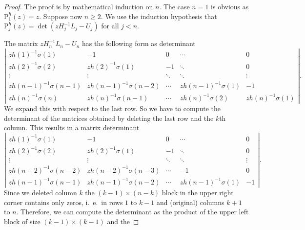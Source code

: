 \documentclass[11pt,reqno]{amsart}
\theoremstyle{plain}
\theoremstyle{remark}
\theoremstyle{definition}
\numberwithin{equation}{section}
\newcommand{\pol}{\mathrm{P}}
\begin{document}
\begin{proof}
The proof is by mathematical induction on $n$.
The case $n=1$ is obvious as $\pol _{1}^{h}\left( z\right) =z$.
Suppose now $n\geq 2$.
We use
the induction hypothesis that
$\pol _{j}^{h}\left( z\right) =\det \left( zH_{j}^{-1}L_{j}-U_{j}\right) $
for all $j<n$.

The matrix $zH_{n}^{-1}L_{n}-U_{n}$ has the following form as determinant
\[
\left|
\begin{array}{ccccc}
zh\left( 1\right) ^{-1}\sigma \left( 1\right) &-1
&0
&\cdots &0\\
zh\left( 2\right) ^{-1}\sigma \left( 2\right)
&zh\left( 2\right) ^{-1}\sigma \left( 1\right) &-1
&\ddots &0\\
\vdots &\vdots
&\ddots &\ddots &\vdots \\
zh\left( n-1\right) ^{-1}\sigma \left( n-1\right)
&zh\left( n-1\right) ^{-1}\sigma \left( n-2\right) &\cdots
&zh\left( n-1\right) ^{-1}\sigma \left( 1\right) &-1\\
zh\left( n\right) ^{-1}\sigma \left( n\right)
&zh\left( n\right) ^{-1}\sigma \left( n-1\right) &\cdots
&zh\left( n\right) ^{-1}\sigma \left( 2\right)
&zh\left( n\right) ^{-1}\sigma \left( 1\right)
\end{array}
\right| .
\]
We expand this with respect to the last row. So we have to compute the
determinant of the matrices obtained by
deleting
the last row and
the $k$th
column. This results in a matrix determinant
\[
\left|
\begin{array}{ccccc}
zh\left( 1\right) ^{-1}\sigma \left( 1\right) &-1
&0&\cdots
&0\\
zh\left( 2\right) ^{-1}\sigma \left( 2\right)
&zh\left( 2\right) ^{-1}\sigma \left( 1\right)
&-1&\ddots
&0\\
\vdots &\vdots
&\ddots
&\ddots &\vdots \\
zh\left( n-2\right) ^{-1}\sigma \left( n-2\right)
&zh\left( n-2\right) ^{-1}\sigma \left( n-3\right) &\cdots
&-1&0\\
zh\left( n-1\right) ^{-1}\sigma \left( n-1\right)
&zh\left( n-1\right) ^{-1}\sigma \left( n-2\right) &\cdots
&zh\left( n-1\right) ^{-1}\sigma \left( 1\right) &-1
\end{array}
\right| .
\]
Since we deleted column $k$
the
$\left( k-1\right) \times \left( n-k\right) $ block in the upper right corner
contains only zeros, i.~e.\ in rows $1$ to $k-1$ and (original) columns $k+1$ to
$n$. Therefore, we can compute the determinant as the product of the upper
left block of size $\left( k-1\right) \times \left( k-1\right) $ and the

\end{proof}
\end{document}

